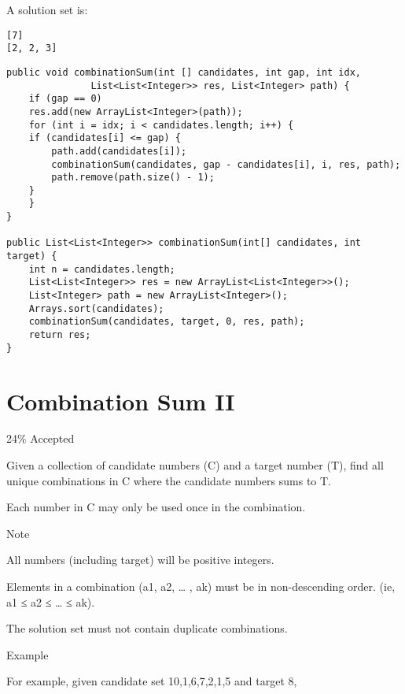 \documentclass[12pt]{book}
\begin{document}
A solution set is: 
\lstset{language=java,label= ,caption= ,numbers=none}
\begin{lstlisting}
[7] 
[2, 2, 3]
\end{lstlisting}
\lstset{language=java,label= ,caption= ,numbers=none}
\begin{lstlisting}
public void combinationSum(int [] candidates, int gap, int idx, 
			   List<List<Integer>> res, List<Integer> path) {
    if (gap == 0) 
	res.add(new ArrayList<Integer>(path));
    for (int i = idx; i < candidates.length; i++) {
	if (candidates[i] <= gap) {
	    path.add(candidates[i]);
	    combinationSum(candidates, gap - candidates[i], i, res, path);
	    path.remove(path.size() - 1);
	}
    }
}

public List<List<Integer>> combinationSum(int[] candidates, int target) {
    int n = candidates.length;
    List<List<Integer>> res = new ArrayList<List<Integer>>();
    List<Integer> path = new ArrayList<Integer>();
    Arrays.sort(candidates);
    combinationSum(candidates, target, 0, res, path);
    return res;
}
\end{lstlisting}
\chapter{Combination Sum II}
\label{sec-21}

24\% Accepted

Given a collection of candidate numbers (C) and a target number (T), find all unique combinations in C where the candidate numbers sums to T.

Each number in C may only be used once in the combination.

Note

All numbers (including target) will be positive integers.

Elements in a combination (a1, a2, … , ak) must be in non-descending order. (ie, a1 ≤ a2 ≤ … ≤ ak).

The solution set must not contain duplicate combinations.

Example

For example, given candidate set 10,1,6,7,2,1,5 and target 8,
\end{document}
